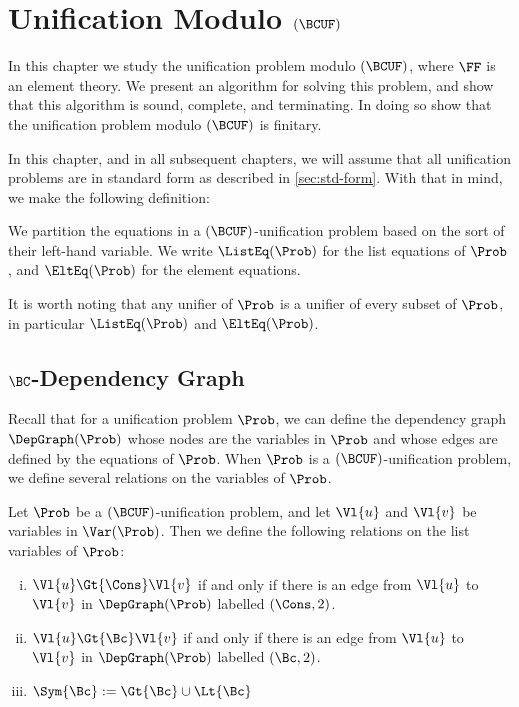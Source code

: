 \chapter{Unification Modulo $(\BCUF)$}\label{chap:unif-bcuh}

In this chapter we study the unification problem modulo $(\BCUF)$, where $\FF$
is an element theory. We present an algorithm for solving this problem, and
show that this algorithm is sound, complete, and terminating. In doing so show
that the unification problem modulo $(\BCUF)$ is finitary.

In this chapter, and in all subsequent chapters, we will assume that all
unification problems are in standard form as described in \cref{sec:std-form}.
With that in mind, we make the following definition:

\setcounter{Theorem}{0}
\begin{Definition}
    We partition the equations in a $(\BCUF)$-unification problem based on the
    sort of their left-hand variable. We write $\ListEq(\Prob)$ for the list
    equations of $\Prob$, and $\EltEq(\Prob)$ for the element equations.
\end{Definition}

It is worth noting that any unifier of $\Prob$ is a unifier of every subset of
$\Prob$, in particular $\ListEq(\Prob)$ and $\EltEq(\Prob)$.

\section{$\BC$-Dependency Graph}

Recall that for a unification problem $\Prob$, we can define the dependency
graph $\DepGraph(\Prob)$ whose nodes are the variables in $\Prob$ and whose
edges are defined by the equations of $\Prob$. When $\Prob$ is a
$(\BCUF)$-unification problem, we define several relations on the variables of
$\Prob$.

\begin{Definition}
    Let $\Prob$ be a $(\BCUF)$-unification problem, and let $\Vl{u}$ and
    $\Vl{v}$ be variables in $\Var(\Prob)$. Then we define the following
    relations on the list variables of $\Prob$:
    \begin{enumerate}[(i)]
        \item $\Vl{u} \Gt{\Cons} \Vl{v}$ if and only if there is an edge from
            $\Vl{u}$ to $\Vl{v}$ in $\DepGraph(\Prob)$ labelled $(\Cons, 2)$.

        \item $\Vl{u} \Gt{\Bc} \Vl{v}$ if and only if there is an edge from
            $\Vl{u}$ to $\Vl{v}$ in $\DepGraph(\Prob)$ labelled $(\Bc, 2)$.

        \item ${\Sym{\Bc}} := {\Gt{\Bc}} \cup {\Lt{\Bc}}$
    \end{enumerate}
\end{Definition}

